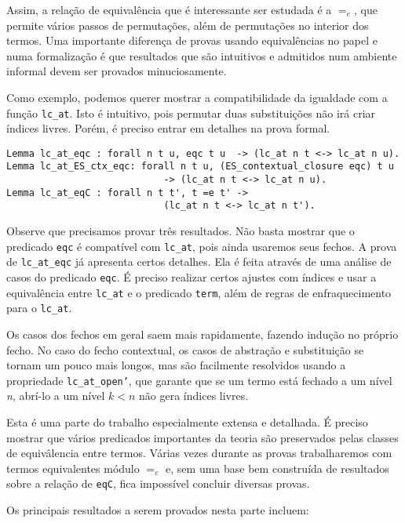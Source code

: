 Assim, a relação de equivalência que é interessante ser estudada é a $=_e$, que
permite vários passos de permutações, além de permutações no interior dos
termos. Uma importante diferença de provas usando equivalências no papel e numa
formalização é que resultados que são intuitivos e admitidos num ambiente
informal devem ser provados minuciosamente.

Como exemplo, podemos querer mostrar a compatibilidade da igualdade com a
função \texttt{lc\_at}. Isto é intuitivo, pois permutar duas substituições não
irá criar índices livres. Porém, é preciso entrar em detalhes na prova formal. 

\begin{lstlisting}[basicstyle=\small]
Lemma lc_at_eqc : forall n t u, eqc t u  -> (lc_at n t <-> lc_at n u).
Lemma lc_at_ES_ctx_eqc: forall n t u, (ES_contextual_closure eqc) t u  
                            -> (lc_at n t <-> lc_at n u).
Lemma lc_at_eqC : forall n t t', t =e t' -> 
                            (lc_at n t <-> lc_at n t').
\end{lstlisting}

Observe que precisamos provar três resultados. Não basta mostrar que o predicado
\texttt{eqc} é compatível com \texttt{lc\_at}, pois ainda usaremos seus fechos.
A prova de \texttt{lc\_at\_eqc} já apresenta certos detalhes. Ela é feita
através de uma análise de casos do predicado \texttt{eqc}. É preciso realizar
certos ajustes com índices e usar a equivalência entre \texttt{lc\_at} e o
predicado \texttt{term}, além de regras de enfraquecimento para o \texttt{lc\_at}.

Os casos dos fechos em geral saem mais rapidamente, fazendo indução no próprio
fecho. No caso do fecho contextual, os casos de abstração e substituição se
tornam um pouco mais longos, mas são facilmente resolvidos usando a propriedade
\texttt{lc\_at\_open'}, que garante que se um termo está fechado a um nível
\emph{n}, abrí-lo a um nível $k < n$ não gera índices livres.

Esta é uma parte do trabalho especialmente extensa e detalhada. É preciso
mostrar que vários predicados importantes da teoria são preservados pelas
classes de equivâlencia entre termos. Várias vezes durante as provas
trabalharemos com termos equivalentes módulo $=_e$ e, sem uma base bem
construída de resultados sobre a relação de \texttt{eqC}, fica impossível
concluir diversas provas.

Os principais resultados a serem provados nesta parte incluem:

